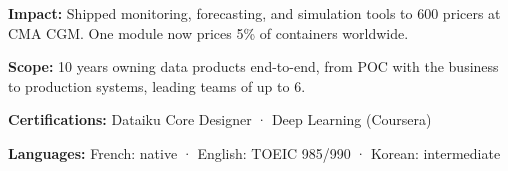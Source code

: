 \vspace{0.2cm}

\begin{cvitems}
  \fontsize{9pt}{1em}\bodyfontlight\selectfont
  \item{\textbf{Impact:} Shipped monitoring, forecasting, and simulation tools to 600 pricers at CMA CGM. One module now prices 5\% of containers worldwide.}
  \item{\textbf{Scope:} 10 years owning data products end-to-end, from POC with the business to production systems, leading teams of up to 6.}
  \item{\textbf{Certifications:} Dataiku Core Designer · Deep Learning (Coursera)}
  \item{\textbf{Languages:} French: native · English: TOEIC 985/990 · Korean: intermediate}
\end{cvitems}
